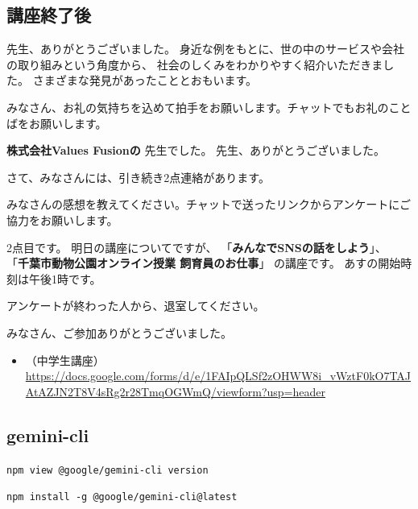 \documentclass[12pt, jafontscale=0.9247]{jlreq}
\begin{document}
\vspace{20pt}

\subsection*{講座終了後}
{\gtfamily\bfseries {}} 先生、ありがとうございました。
身近な例をもとに、世の中のサービスや会社の取り組みという角度から、
社会のしくみをわかりやすく紹介いただきました。 さまざまな発見があったこととおもいます。

みなさん、お礼の気持ちを込めて拍手をお願いします。チャットでもお礼のことばをお願いします。

{\gtfamily\bfseries 株式会社Values Fusionの}
先生でした。 先生、ありがとうございました。

\bigskip

さて、みなさんには、引き続き2点連絡があります。

みなさんの感想を教えてください。チャットで送ったリンクからアンケートにご協力をお願いします。

2点目です。 明日の講座についてですが、 「{\gtfamily\bfseries みんなでSNSの話をしよう}」、 「{\gtfamily\bfseries 千葉市動物公園オンライン授業 飼育員のお仕事}」
の講座です。 あすの開始時刻は午後1時です。

アンケートが終わった人から、退室してください。

みなさん、ご参加ありがとうございました。

\begin{itemize}

  \item （中学生講座）\\
        \url{https://docs.google.com/forms/d/e/1FAIpQLSf2zOHWW8i_vWztF0kO7TAJAtAZJN2T8V4sRg2r28TmqOGWmQ/viewform?usp=header}
\end{itemize}

\newpage
\subsection*{gemini-cli}
\verb*|npm view @google/gemini-cli version|

\verb*|npm install -g @google/gemini-cli@latest|
\end{document}
